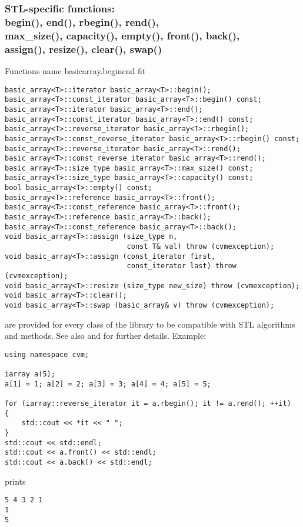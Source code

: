 \subsubsection{STL-specific functions:\\
begin(), end(), rbegin(), rend(), \\
max\_size(), capacity(), empty(), front(), back(),\\
assign(), resize(), clear(), swap()}
Functions%
\pdfdest name {basicarray.beginend} fit
\begin{verbatim}
basic_array<T>::iterator basic_array<T>::begin();
basic_array<T>::const_iterator basic_array<T>::begin() const;
basic_array<T>::iterator basic_array<T>::end();
basic_array<T>::const_iterator basic_array<T>::end() const;
basic_array<T>::reverse_iterator basic_array<T>::rbegin();
basic_array<T>::const_reverse_iterator basic_array<T>::rbegin() const;
basic_array<T>::reverse_iterator basic_array<T>::rend();
basic_array<T>::const_reverse_iterator basic_array<T>::rend();
basic_array<T>::size_type basic_array<T>::max_size() const;
basic_array<T>::size_type basic_array<T>::capacity() const;
bool basic_array<T>::empty() const;
basic_array<T>::reference basic_array<T>::front();
basic_array<T>::const_reference basic_array<T>::front();
basic_array<T>::reference basic_array<T>::back();
basic_array<T>::const_reference basic_array<T>::back();
void basic_array<T>::assign (size_type n, 
                             const T& val) throw (cvmexception);
void basic_array<T>::assign (const_iterator first, 
                             const_iterator last) throw (cvmexception);
void basic_array<T>::resize (size_type new_size) throw (cvmexception);
void basic_array<T>::clear();
void basic_array<T>::swap (basic_array& v) throw (cvmexception);
\end{verbatim}
are provided for every class of the library to be compatible 
with STL algorithms and methods. See also 
and 
for further details.
Example:
\begin{Verbatim}
using namespace cvm;

iarray a(5);
a[1] = 1; a[2] = 2; a[3] = 3; a[4] = 4; a[5] = 5;

for (iarray::reverse_iterator it = a.rbegin(); it != a.rend(); ++it)
{
    std::cout << *it << " ";
}
std::cout << std::endl;
std::cout << a.front() << std::endl;
std::cout << a.back() << std::endl;
\end{Verbatim}
prints
\begin{Verbatim}
5 4 3 2 1
1
5
\end{Verbatim}
\newpage


